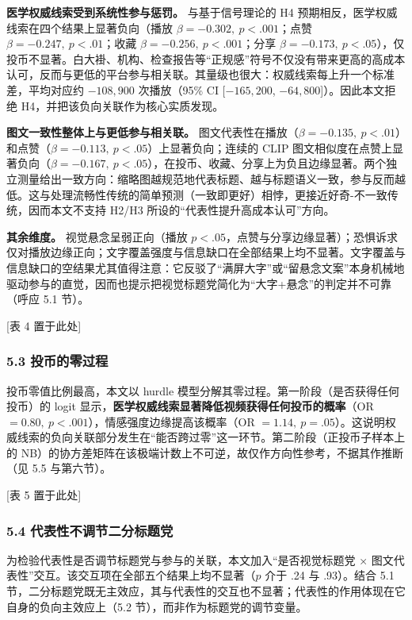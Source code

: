 \documentclass[
  fontset=none]{ctexart}
\begin{document}
\textbf{医学权威线索受到系统性参与惩罚。} 与基于信号理论的 H4 预期相反，医学权威线索在四个结果上显著负向（播放 \(\beta=-0.302,\ p<.001\)；点赞 \(\beta=-0.247,\ p<.01\)；收藏 \(\beta=-0.256,\ p<.001\)；分享 \(\beta=-0.173,\ p<.05\)），仅投币不显著。白大褂、机构、检查报告等``正规感''符号不仅没有带来更高的高成本认可，反而与更低的平台参与相关联。其量级也很大：权威线索每上升一个标准差，平均对应约 \(-108{,}900\) 次播放（95\% CI [\(-165{,}200\), \(-64{,}800\)]）。因此本文拒绝 H4，并把该负向关联作为核心实质发现。

\textbf{图文一致性整体上与更低参与相关联。} 图文代表性在播放（\(\beta=-0.135,\ p<.01\)）和点赞（\(\beta=-0.113,\ p<.05\)）上显著负向；连续的 CLIP 图文相似度在点赞上显著负向（\(\beta=-0.167,\ p<.05\)），在投币、收藏、分享上为负且边缘显著。两个独立测量给出一致方向：缩略图越规范地代表标题、越与标题语义一致，参与反而越低。这与处理流畅性传统的简单预测（一致即更好）相悖，更接近好奇-不一致传统，因而本文不支持 H2/H3 所设的``代表性提升高成本认可''方向。

\textbf{其余维度。} 视觉悬念呈弱正向（播放 \(p<.05\)，点赞与分享边缘显著）；恐惧诉求仅对播放边缘正向；文字覆盖强度与信息缺口在全部结果上均不显著。文字覆盖与信息缺口的空结果尤其值得注意：它反驳了``满屏大字''或``留悬念文案''本身机械地驱动参与的直觉，因而也提示把视觉标题党简化为``大字+悬念''的判定并不可靠（呼应 5.1 节）。

{[}表 4 置于此处{]}

\subsubsection{5.3 投币的零过程}\label{ux6295ux5e01}

投币零值比例最高，本文以 hurdle 模型分解其零过程。第一阶段（是否获得任何投币）的 logit 显示，\textbf{医学权威线索显著降低视频获得任何投币的概率}（OR \(=0.80,\ p<.001\)），情感强度边缘提高该概率（OR \(=1.14,\ p=.05\)）。这说明权威线索的负向关联部分发生在``能否跨过零''这一环节。第二阶段（正投币子样本上的 NB）的协方差矩阵在该极端计数上不可逆，故仅作方向性参考，不据其作推断（见 5.5 与第六节）。

{[}表 5 置于此处{]}

\subsubsection{5.4 代表性不调节二分标题党}\label{ux4ea4ux4e92}

为检验代表性是否调节标题党与参与的关联，本文加入``是否视觉标题党 × 图文代表性''交互。该交互项在全部五个结果上均不显著（\(p\) 介于 .24 与 .93）。结合 5.1 节，二分标题党既无主效应，其与代表性的交互也不显著；代表性的作用体现在它自身的负向主效应上（5.2 节），而非作为标题党的调节变量。
\end{document}
